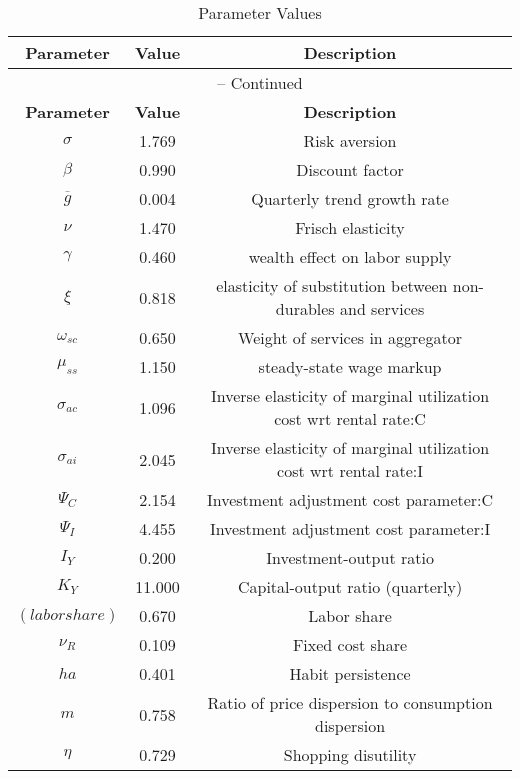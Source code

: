 \begin{center}
\begin{longtable}{ccc}
\caption{Parameter Values}\\%
\toprule%
\multicolumn{1}{c}{\textbf{Parameter}} &
\multicolumn{1}{c}{\textbf{Value}} &
 \multicolumn{1}{c}{\textbf{Description}}\\%
\midrule%
\endfirsthead
\multicolumn{3}{c}{{\tablename} \thetable{} -- Continued}\\%
\midrule%
\multicolumn{1}{c}{\textbf{Parameter}} &
\multicolumn{1}{c}{\textbf{Value}} &
  \multicolumn{1}{c}{\textbf{Description}}\\%
\midrule%
\endhead
${\sigma}$ 	 & 	 1.769 	 & 	 Risk aversion\\
${\beta}$ 	 & 	 0.990 	 & 	 Discount factor\\
${\overline{g}}$ 	 & 	 0.004 	 & 	 Quarterly trend growth rate\\
$\nu$ 	 & 	 1.470 	 & 	 Frisch elasticity\\
$\gamma$ 	 & 	 0.460 	 & 	 wealth effect on labor supply\\
$\xi$ 	 & 	 0.818 	 & 	 elasticity of substitution between non-durables and services\\
$\omega_{sc}$ 	 & 	 0.650 	 & 	 Weight of services in aggregator\\
$\mu_{ss}$ 	 & 	 1.150 	 & 	 steady-state wage markup\\
${\sigma_{ac}}$ 	 & 	 1.096 	 & 	 Inverse elasticity of marginal utilization cost wrt rental rate:C\\
${\sigma_{ai}}$ 	 & 	 2.045 	 & 	 Inverse elasticity of marginal utilization cost wrt rental rate:I\\
${\Psi_C}$ 	 & 	 2.154 	 & 	 Investment adjustment cost parameter:C\\
${\Psi_I}$ 	 & 	 4.455 	 & 	 Investment adjustment cost parameter:I\\
${I_Y}$ 	 & 	 0.200 	 & 	 Investment-output ratio\\
${K_Y}$ 	 & 	 11.000 	 & 	 Capital-output ratio (quarterly)\\
$(labor share)$ 	 & 	 0.670 	 & 	 Labor share\\
${\nu_R}$ 	 & 	 0.109 	 & 	 Fixed cost share\\
${ha}$ 	 & 	 0.401 	 & 	 Habit persistence\\
${m}$ 	 & 	 0.758 	 & 	 Ratio of price dispersion to consumption dispersion\\
${\eta}$ 	 & 	 0.729 	 & 	 Shopping disutility\\

\end{longtable}
\end{center}
